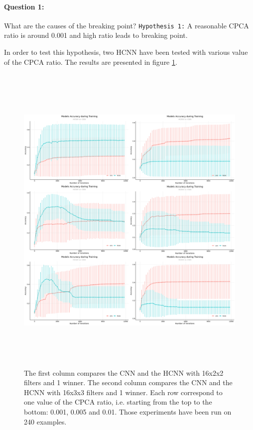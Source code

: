 \documentclass[11pt]{report}
\begin{document}
\paragraph{Question 1:} What are the causes of the breaking point?
\newline
\newline
\texttt{Hypothesis 1:} A reasonable CPCA ratio is around 0.001 and high ratio leads to breaking point.
\newline

\noindent In order to test this hypothesis, two HCNN have been tested with various value of the CPCA ratio. The results are presented in figure \ref{fig:hcnn_breaking_point}.

\begin{figure}[h]
\centering
\includegraphics[width=15cm, height=15.5cm]{longRun-f_16-ds_250}
\caption[Experiment 1: What are the causes of the breaking point?]{The first column compares the CNN and the HCNN with 16x2x2 filters and 1 winner. The second column compares the CNN and the HCNN with 16x3x3 filters and 1 winner. Each row correspond to one value of the CPCA ratio, i.e. starting from the top to the bottom: 0.001, 0.005 and 0.01. Those experiments have been run on 240 examples.}
\label{fig:hcnn_breaking_point}
\end{figure}
\end{document}
